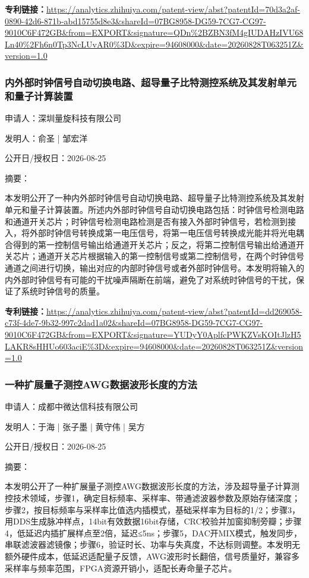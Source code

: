 \documentclass[12pt,a4paper]{ctexart}
\begin{document}
\noindent\textbf{专利链接：}\url{https://analytics.zhihuiya.com/patent-view/abst?patentId=70d3a2af-0890-42d6-871b-abd15755d8e3&shareId=07BG8958-DG59-7CG7-CG97-9010C6F472GB&from=EXPORT&signature=QDn%2BZBN3fM4gIUDAHzIVU68Ln40%2Fh6n0Tp3NcLUvAR0%3D&expire=94608000&date=20260828T063251Z&version=1.0}

\subsubsection{ 内外部时钟信号自动切换电路、超导量子比特测控系统及其发射单元和量子计算装置 }

申请人：深圳量旋科技有限公司

发明人：俞圣 | 邹宏洋

公开日/授权日：2026-08-25

摘要：

本发明公开了一种内外部时钟信号自动切换电路、超导量子比特测控系统及其发射单元和量子计算装置。所述内外部时钟信号自动切换电路包括：时钟信号检测电路和通道开关芯片；时钟信号检测电路检测是否有接入外部时钟信号，若检测到接入，将外部时钟信号转换成第一电压信号，将第一电压信号转换成光能并将光电耦合得到的第一控制信号输出给通道开关芯片；反之，将第二控制信号输出给通道开关芯片；通道开关芯片根据输入的第一控制信号或第二控制信号，在两个时钟信号通道之间进行切换，输出对应的内部时钟信号或者外部时钟信号。本发明将输入的内外部时钟信号有可能的干扰噪声隔断在前端，避免了对系统时钟信号的干扰，保证了系统时钟信号的质量。

\noindent\textbf{专利链接：}\url{https://analytics.zhihuiya.com/patent-view/abst?patentId=dd269058-c73f-4de7-9b32-997c2dad1a02&shareId=07BG8958-DG59-7CG7-CG97-9010C6F472GB&from=EXPORT&signature=YUDyY0AplfcPWKZVsKOItJlzH5LAKR8sHHUo603aciE%3D&expire=94608000&date=20260828T063251Z&version=1.0}

\subsubsection{ 一种扩展量子测控AWG数据波形长度的方法 }

申请人：成都中微达信科技有限公司

发明人：于海 | 张子墨 | 黄守伟 | 吴方

公开日/授权日：2026-08-25

摘要：

本发明公开了一种扩展量子测控AWG数据波形长度的方法，涉及超导量子计算测控技术领域，步骤1，确定目标频率、采样率、带通滤波器参数及原始存储深度；步骤2，按目标频率与采样率比值选内插模式，基础采样率为目标的1/2；步骤3，用DDS生成脉冲样点，14bit有效数据16bit存储，CRC校验并加窗抑制旁瓣；步骤4，低延迟内插扩展样点至2倍，延迟≤5ns；步骤5，DAC开MIX模式，触发同步，串联滤波器滤镜像；步骤6，验证时长、功率与失真度，不达标则调整。本发明无额外硬件成本，低延迟适配量子反馈，AWG波形时长翻倍，信号质量好，兼容多采样率与频率范围，FPGA资源开销小，适配长寿命量子芯片。
\end{document}
